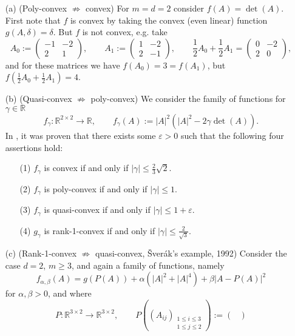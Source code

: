 \begin{example}
\begin{itemize}
	\item[(a)] (Poly-convex $\not\Rightarrow$ convex) For $m=d=2$ consider $f(A)=\det(A)$. First note that $f$ is convex by taking the convex (even linear) function $g(A,\delta)=\delta$. But $f$ is not convex, e.g. take
	\[A_0:=\begin{pmatrix}-1&-2\\2&1\end{pmatrix},\qquad A_1:=\begin{pmatrix}1&-2\\2&-1\end{pmatrix},\qquad\frac{1}{2}A_0+\frac{1}{2}A_1=\begin{pmatrix}0&-2\\2&0\end{pmatrix},\]
	and for these matrices we have $f(A_0)=3=f(A_1)$, but $f(\frac{1}{2}A_0+\frac{1}{2}A_1)=4$.
	\item[(b)] (Quasi-convex $\not\Rightarrow$ poly-convex) We consider the family of functions for $\gamma\in\mathbb{R}$
    \[
        f_\gamma:\mathbb{R}^{2\times 2}\longrightarrow\mathbb{R},\qquad f_\gamma(A):=\lvert A\rvert^2\left(\lvert A\rvert^2-2\gamma\det(A)\right).
    \]
	In \cite{AliDac1992EQFP}, it was proven that there exists some $\varepsilon>0$ such that the following four assertions hold:
	\begin{itemize}
		\item[(1)] $f_\gamma$ is convex if and only if $\lvert\gamma\rvert\leq\frac{2}{3}\sqrt{2}$.
		\item[(2)] $f_\gamma$ is poly-convex if and only if $\lvert\gamma\rvert\leq1$.
		\item[(3)] $f_\gamma$ is quasi-convex if and only if $\lvert\gamma\rvert\leq1+\varepsilon$.
		\item[(4)] $g_\gamma$ is rank-1-convex if and only if $\lvert\gamma\rvert\leq\frac{2}{\sqrt{3}}$.
	\end{itemize}
	\item[(c)] (Rank-1-convex $\not\Rightarrow$ quasi-convex, \v{S}ver\'ak's example, 1992) Consider the case $d=2$, $m\geq3$, and again a family of functions, namely
	\[f_{\alpha,\beta}(A)=g(P(A))+\alpha\left(\lvert A\rvert^2+\lvert A\rvert^4\right)+\beta\lvert A-P(A)\rvert^2\]
	for $\alpha,\beta>0$, and where
	\[P:\mathbb{R}^{3\times 2}\longrightarrow\mathbb{R}^{3\times 2},\qquad P\left((A_{ij})_{\substack{1\leq i\leq 3\\1\leq j\leq 2}}\right):=\begin{pmatrix}

\end{pmatrix}\]
\end{itemize}
\end{example}
